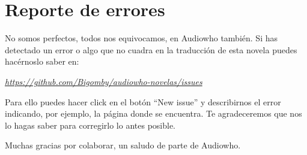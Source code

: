 \chapter*{Reporte de errores}

No somos perfectos, todos nos equivocamos, en Audiowho también. Si has detectado un error o algo que no cuadra en la traducción de esta novela puedes hacérnoslo saber en:

\mbox{}

\begin{center}
\href{https://github.com/Bigomby/audiowho-novelas/issues}{\textit{https://github.com/Bigomby/audiowho-novelas/issues}}
\end{center}

\mbox{}

Para ello puedes hacer click en el botón “New issue” y describirnos el error indicando, por ejemplo, la página donde se encuentra. Te agradeceremos que nos lo hagas saber para corregirlo lo antes posible.

\mbox{}

Muchas gracias por colaborar, un saludo de parte de Audiowho.
